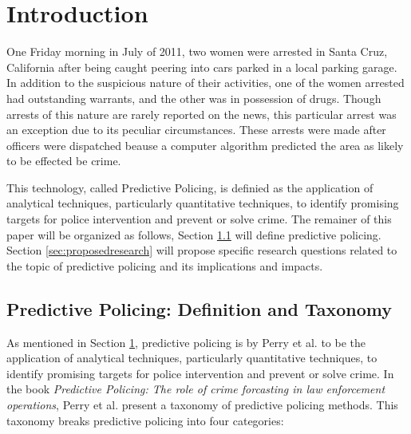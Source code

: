 \documentclass[12pt]{article} %
\begin{document}
\clearpage\thispagestyle{empty}\addtocounter{page}{-1}
\tableofcontents %
\newpage %


\section{Introduction}\label{sec:introduction} %

One Friday morning in July of 2011, two women were arrested in Santa Cruz, California after being caught peering into cars parked in a local parking garage. In addition to the suspicious nature of their activities, one of the women arrested had outstanding warrants, and the other was in possession of drugs. Though arrests of this nature are rarely reported on the news, this particular arrest was an exception due to its peculiar circumstances. These arrests were made after officers were dispatched beause a computer algorithm predicted the area as likely to be effected be crime. \cite{nyt} 

This technology, called Predictive Policing, is definied as the application of analytical techniques, particularly quantitative techniques, to identify promising targets for police intervention and prevent or solve crime. \cite{perryetal} The remainer of this paper will be organized as follows, Section \ref{sec:predictivepolicing} will define predictive policing.
Section \ref{sec:proposedresearch} will propose specific research questions related to the topic of predictive policing and its implications and impacts.
\subsection{Predictive Policing: Definition and Taxonomy} \label{sec:predictivepolicing}%

As mentioned in Section \ref{sec:introduction}, predictive policing is by Perry et al. to be the application of analytical techniques, particularly quantitative techniques, to identify promising targets for police intervention and prevent or solve crime. In the book \textit{Predictive Policing: The role of crime forcasting in law enforcement operations}, Perry et al. present a taxonomy of predictive policing methods. This taxonomy breaks predictive policing into four categories: \cite{perryetal}
\end{document}
